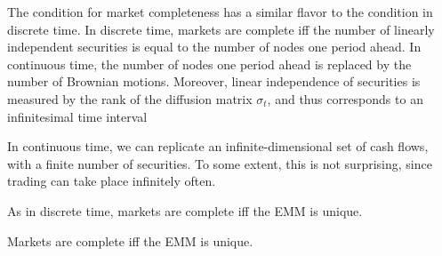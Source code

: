 \documentclass[\topdir/lecture\_notes.tex]{subfiles}
\begin{document}
The condition for market completeness has a similar flavor to the condition in discrete time. In discrete time, markets are complete iff the number of linearly independent securities is equal to the number of nodes one period ahead. In continuous time, the number of nodes one period ahead is replaced by the number of Brownian motions. Moreover, linear independence of securities is measured by the rank of the diffusion matrix \(\sigma_{t}\), and thus corresponds to an infinitesimal time interval

In continuous time, we can replicate an infinite-dimensional set of cash flows, with a finite number of securities. To some extent, this is not surprising, since trading can take place infinitely often.

As in discrete time, markets are complete iff the EMM is unique.

\begin{theorem}\label{thm:6.2.2}
Markets are complete iff the EMM is unique.
\end{theorem}
\end{document}
